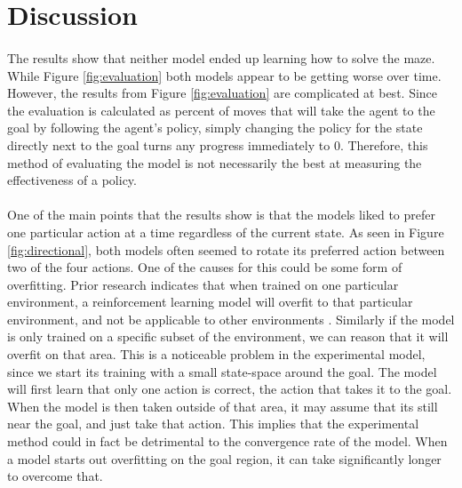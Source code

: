 \documentclass[12pt]{article}
\begin{document}
\section{Discussion}

% 


\paragraph{}
The results show that neither model ended up learning how to solve the maze. 
While Figure \ref{fig:evaluation} both models appear to be getting worse over time.
However, the results from Figure \ref{fig:evaluation} are complicated at best.
Since the evaluation is calculated as percent of moves that will take the agent to the goal by following the agent's policy, simply changing the policy for the state directly next to the goal turns any progress immediately to 0.
Therefore, this method of evaluating the model is not necessarily the best at measuring the effectiveness of a policy.

\paragraph{}
One of the main points that the results show is that the models liked to prefer one particular action at a time regardless of the current state.
As seen in Figure \ref{fig:directional}, both models often seemed to rotate its preferred action between two of the four actions. %
One of the causes for this could be some form of overfitting.
Prior research indicates that when trained on one particular environment, a reinforcement learning model will overfit to that particular environment, and not be applicable to other environments \cite{article_overfitting_neural_networks}.
Similarly if the model is only trained on a specific subset of the environment, we can reason that it will overfit on that area.
This is a noticeable problem in the experimental model, since we start its training with a small state-space around the goal.
The model will first learn that only one action is correct, the action that takes it to the goal.
When the model is then taken outside of that area, it may assume that its still near the goal, and just take that action.
This implies that the experimental method could in fact be detrimental to the convergence rate of the model.
When a model starts out overfitting on the goal region, it can take significantly longer to overcome that.
\end{document}
